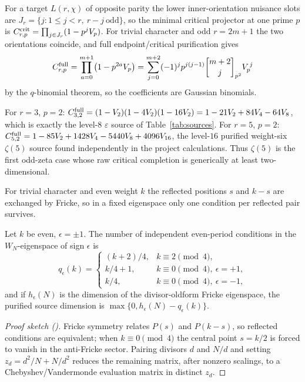 For a target $L(r,\chi)$ of opposite parity the lower inner-orientation
nuisance slots are $J_r=\{j:1\le j<r,\ r-j\ \text{odd}\}$, so the minimal
critical projector at one prime $p$ is
$C^{\rm crit}_{r,p}=\prod_{j\in J_r}(1-p^jV_p)$.  For trivial character and
odd $r=2m+1$ the two orientations coincide, and full endpoint/critical
purification gives
\begin{equation}\label{eq:fullproj}
C^{\rm full}_{r,p}=\prod_{a=0}^{m+1}\bigl(1-p^{2a}V_p\bigr)
=\sum_{j=0}^{m+2}(-1)^jp^{j(j-1)}{m+2\brack j}_{p^2}V_p^{\,j}
\end{equation}
by the $q$-binomial theorem, so the coefficients are Gaussian binomials.

\begin{example}\label{ex:proj}
For $r=3$, $p=2$: $C^{\rm full}_{3,2}=(1-V_2)(1-4V_2)(1-16V_2)
=1-21V_2+84V_4-64V_8$, which is exactly the level-$8$ $\varepsilon$ source of
Table~\ref{tab:sources}.  For $r=5$, $p=2$:
$C^{\rm full}_{5,2}=1-85V_2+1428V_4-5440V_8+4096V_{16}$, the level-$16$
purified weight-six $\zeta(5)$ source found independently in the project
calculations.  Thus $\zeta(5)$ is the first odd-zeta case whose raw critical
completion is generically at least two-dimensional.
\end{example}

For trivial character and even weight $k$ the reflected positions $s$ and
$k-s$ are exchanged by Fricke, so in a fixed eigenspace only one condition per
reflected pair survives.

\begin{theorem}\label{thm:frickecount}
\Proved{} Let $k$ be even, $\epsilon=\pm1$.  The number of independent
even-period conditions in the $W_N$-eigenspace of sign $\epsilon$ is
\[
q_\epsilon(k)=
\begin{cases}
(k+2)/4,&k\equiv2\!\!\pmod4,\\
k/4+1,&k\equiv0\!\!\pmod4,\ \epsilon=+1,\\
k/4,&k\equiv0\!\!\pmod4,\ \epsilon=-1,
\end{cases}
\]
and if $h_\epsilon(N)$ is the dimension of the divisor-oldform Fricke
eigenspace, the purified source dimension is
$\max\{0,h_\epsilon(N)-q_\epsilon(k)\}$.
\end{theorem}

\begin{proof}[Proof sketch {\rm(\cite[\S5]{ProjBook})}]
Fricke symmetry relates $P(s)$ and $P(k-s)$, so reflected conditions are
equivalent; when $k\equiv0\pmod4$ the central point $s=k/2$ is forced to
vanish in the anti-Fricke sector.  Pairing divisors $d$ and $N/d$ and setting
$z_d=d^2/N+N/d^2$ reduces the remaining matrix, after nonzero scalings, to a
Chebyshev/Vandermonde evaluation matrix in distinct $z_d$.
\end{proof}


